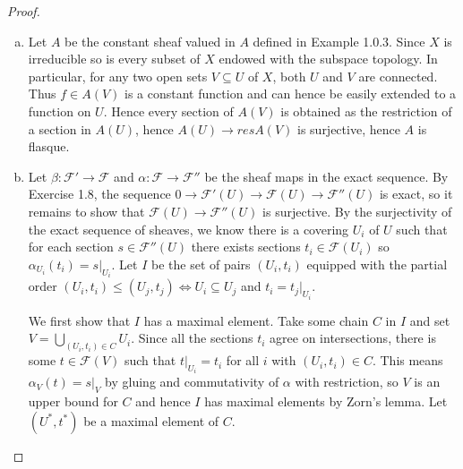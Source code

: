 \begin{problemset}
\begin{enumerate}[(a)]
	\end{enumerate}
	\begin{proof}$ $
		\begin{enumerate}[(a)]
			\item {}Let $A$ be the constant sheaf valued in $A$ defined in Example 1.0.3. Since $X$ is irreducible so is every subset of $X$ endowed with the subspace topology. In particular, for any two open sets $V \subseteq U$ of $X$, both $U$ and $V$ are connected. Thus $f\in A(V)$ is a constant function and can hence be easily extended to a function on $U$. Hence every section of $A(V)$ is obtained as the restriction of a section in $A(U)$, hence $A(U)\to{res}A(V)$ is surjective, hence $A$ is flasque.
			\item {} Let $\beta:\mathcal F'\to \mathcal F$ and $\alpha: \mathcal F\to \mathcal F''$ be the sheaf maps in the exact sequence. By Exercise 1.8, the sequence $0 \to \mathcal F'(U) \to \mathcal F(U) \to \mathcal F''(U)$ is exact, so it remains to show that $\mathcal F(U)\to \mathcal F''(U)$ is surjective. By the surjectivity of the exact sequence of sheaves, we know there is a covering $U_i$ of $U$ such that for each section $s\in \mathcal F''(U)$ there exists sections $t_i \in \mathcal F(U_i)$ so $\alpha_{U_i}(t_i) = s|_{U_i}$. Let $I$ be the set of pairs $(U_i,t_i)$ equipped with the partial order $(U_i,t_i) \leq (U_j,t_j) \iff U_i \subseteq U_j$ and $t_i = t_j|_{U_i}$.

				\medskip

				We first show that $I$ has a maximal element. Take some chain $C$ in $I$ and set $V = \bigcup_{(U_i,t_i)\in C} U_i$. Since all the sections $t_i$ agree on intersections, there is some $t \in \mathcal F(V)$ such that $t|_{U_i} = t_i$ for all $i$ with $(U_i,t_i)\in C$. This means $\alpha_V(t) = s|_V$ by gluing and commutativity of $\alpha$ with restriction, so $V$ is an upper bound for $C$ and hence $I$ has maximal elements by Zorn's lemma. Let $(U^*,t^*)$ be a maximal element of $C$.


\end{enumerate}
\end{proof}
\end{problemset}
